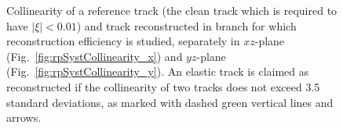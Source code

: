 \begin{figure}[t!]
\centering
\parbox{0.4725\textwidth}{
  \centering
  \begin{subfigure}[b]{\linewidth}
  \end{subfigure}
}%
\quad\quad%
\parbox{0.4725\textwidth}{
  \centering
  \begin{subfigure}[b]{\linewidth}
  \end{subfigure}
}%
\caption[Collinearity of a reference track and track reconstructed in studied branch.]%
    {Collinearity of a reference track (the clean track which is required to have $|\xi|<0.01$) and track reconstructed in branch for which reconstruction efficiency is studied, separately in $xz$-plane (Fig.~\ref{fig:rpSystCollinearity_x}) and $yz$-plane (Fig.~\ref{fig:rpSystCollinearity_y}). An elastic track is claimed as reconstructed if the collinearity of two tracks does not exceed 3.5 standard deviations, as marked with dashed green vertical lines and arrows.}\label{fig:rpSystCollinearity}%
\end{figure}

